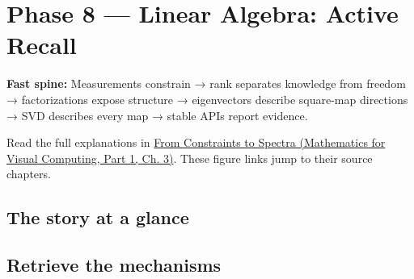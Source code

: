 \hypertarget{appendix-932cf7182ff1}{}\label{referencestart:appendix-932cf7182ff1}
\section{Phase 8 --- Linear Algebra: Active Recall}\label{appendix-932cf7182ff1-phase-8-linear-algebra-active-recall}

\hypertarget{appendix-932cf7182ff1-phase-8-linear-algebra-active-recall}{}

\textbf{Fast spine:} Measurements constrain → rank separates knowledge from freedom → factorizations expose structure → eigenvectors describe square-map directions → SVD describes every map → stable APIs report evidence.

Read the full explanations in \href{../02-Mathematics-for-Visual-Computing-P01/main.pdf\#nameddest=01-foundations-i-ch019-the-graphics-problem-hiding-inside-a-matrix-equation}{From Constraints to Spectra (Mathematics for Visual Computing, Part 1, Ch. 3)}. These figure links jump to their source chapters.

\subsection{The story at a glance}\label{appendix-932cf7182ff1-the-story-at-a-glance}

\hypertarget{appendix-932cf7182ff1-the-story-at-a-glance}{}


\subsection{Retrieve the mechanisms}\label{appendix-932cf7182ff1-retrieve-the-mechanisms}

\hypertarget{appendix-932cf7182ff1-retrieve-the-mechanisms}{}

